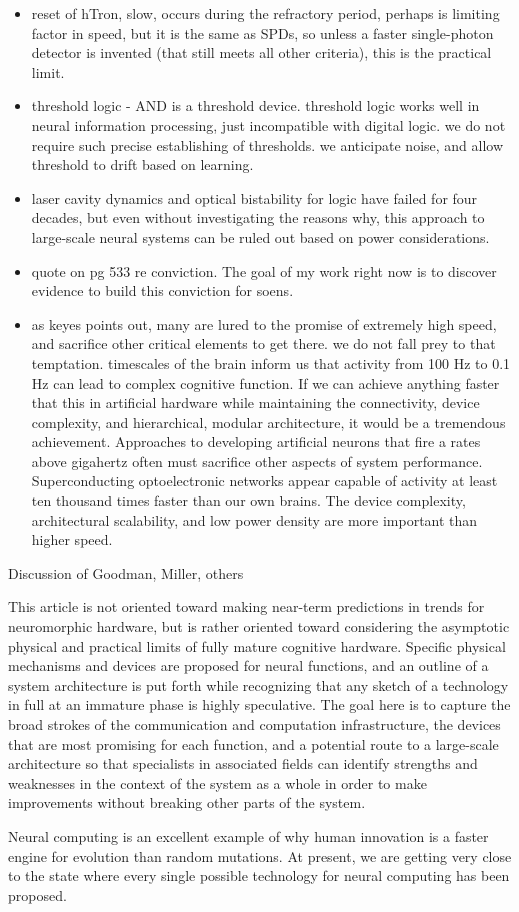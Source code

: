 \begin{itemize}
\item reset of hTron, slow, occurs during the refractory period, perhaps is limiting factor in speed, but it is the same as SPDs, so unless a faster single-photon detector is invented (that still meets all other criteria), this is the practical limit.
\item threshold logic - AND is a threshold device. threshold logic works well in neural information processing, just incompatible with digital logic. we do not require such precise establishing of thresholds. we anticipate noise, and allow threshold to drift based on learning. 
\item laser cavity dynamics and optical bistability for logic have failed for four decades, but even without investigating the reasons why, this approach to large-scale neural systems can be ruled out based on power considerations. 
\item \cite{ke1985b} quote on pg 533 re conviction. The goal of my work right now is to discover evidence to build this conviction for soens.
\item as keyes points out, many are lured to the promise of extremely high speed, and sacrifice other critical elements to get there. we do not fall prey to that temptation. timescales of the brain inform us that activity from 100 Hz to 0.1 Hz can lead to complex cognitive function. If we can achieve anything faster that this in artificial hardware while maintaining the connectivity, device complexity, and hierarchical, modular architecture, it would be a tremendous achievement. Approaches to developing artificial neurons that fire a rates above gigahertz often must sacrifice other aspects of system performance. Superconducting optoelectronic networks appear capable of activity at least ten thousand times faster than our own brains. The device complexity, architectural scalability, and low power density are more important than higher speed. 
\end{itemize}

\vspace{3em}
Discussion of Goodman, Miller, others

\vspace{3em}
This article is not oriented toward making near-term predictions in trends for neuromorphic hardware, but is rather oriented toward considering the asymptotic physical and practical limits of fully mature cognitive hardware. Specific physical mechanisms and devices are proposed for neural functions, and an outline of a system architecture is put forth while recognizing that any sketch of a technology in full at an immature phase is highly speculative. The goal here is to capture the broad strokes of the communication and computation infrastructure, the devices that are most promising for each function, and a potential route to a large-scale architecture so that specialists in associated fields can identify strengths and weaknesses in the context of the system as a whole in order to make improvements without breaking other parts of the system.

\vspace{3em}
Neural computing is an excellent example of why human innovation is a faster engine for evolution than random mutations. At present, we are getting very close to the state where every single possible technology for neural computing has been proposed.